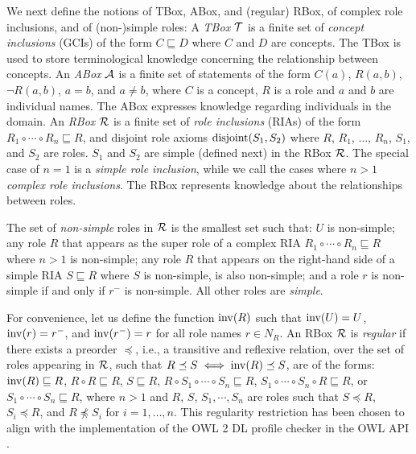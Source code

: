 We next define the notions of TBox, ABox, and (regular) RBox, of complex role inclusions, and of (non-)simple roles:
A \emph{TBox} $\mathcal{T}$ is a finite set of \emph{concept inclusions} (GCIs) of the form $C \sqsubseteq D$ where $C$ and $D$ are concepts. The TBox is used to store terminological knowledge concerning the relationship between concepts. 
%
An \emph{ABox} $\mathcal{A}$ is a finite set of statements of the form $C(a)$, $R(a,b)$, $\lnot R (a,b)$, $a = b$, and $a \not= b$, where $C$ is a concept, $R$ is a role and $a$ and $b$ are individual names. The ABox expresses knowledge regarding individuals in the domain. 
%
An \emph{RBox} $\mathcal{R}$ is a finite set of \emph{role inclusions} (RIAs) of the form $R_1 \circ \cdots \circ R_n \sqsubseteq R$, and disjoint role axioms $\operatorname{disjoint}(S_1, S_2)$ where $R$, $R_1$, $\dots$, $R_n$, $S_1$, and $S_2$ are roles. $S_1$ and $S_2$ are simple (defined next) in the RBox $\mathcal{R}$. The special case of $n = 1$ is a \emph{simple role inclusion}, while we call the cases where $n > 1$ \emph{complex role inclusions}. The RBox represents knowledge about the relationships between roles.

The set of \emph{non-simple} roles in $\mathcal{R}$ is the smallest set such that: $U$ is non-simple; any role $R$ that appears as the super role of a complex RIA $R_1 \circ \cdots \circ R_n \sqsubseteq R$ where $n > 1$ is non-simple; any role $R$ that appears on the right-hand side of a simple RIA $S \sqsubseteq R$ where $S$ is non-simple, is also non-simple; and a role $r$ is non-simple if and only if $r^-$ is non-simple.
All other roles are \emph{simple}.

For convenience, let us define the function $\operatorname{inv}(R)$ such that $\operatorname{inv}(U) = U$, $\operatorname{inv}(r) = r^-$, and $\operatorname{inv}(r^-) = r$ for all role names $r \in N_R$. 
%
An RBox $\mathcal{R}$ is \emph{regular} if there exists a preorder $\preceq$, i.e., a transitive and reflexive relation, over the set of roles appearing in $\mathcal{R}$, such that $R \preceq S \iff \operatorname{inv}(R) \preceq S$, are of the forms:
$\operatorname{inv}(R) \sqsubseteq R$,
$R \circ R \sqsubseteq R$,
$S \sqsubseteq R$, $R \circ S_1 \circ \cdots \circ S_n \sqsubseteq R$,
$S_1 \circ \cdots \circ S_n \circ R \sqsubseteq R$, or
$S_1 \circ \cdots \circ S_n \sqsubseteq R$,
where $n > 1$ and $R$, $S$, $S_1, \cdots, S_n$ are roles such that $S \preceq R$, $S_i \preceq R$, and $R \not\preceq S_i$ for $i = 1, \dots, n$. This regularity restriction has been chosen to align with the implementation of the OWL 2 DL \cite{motik2012ontology} profile checker in the OWL API \cite{horridge2011owl}.


